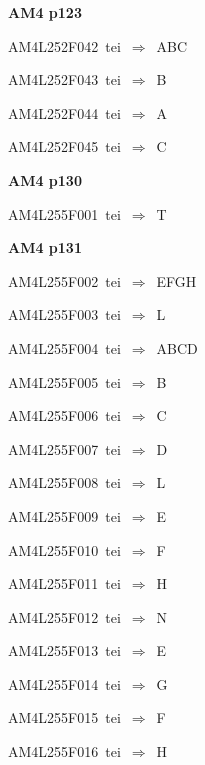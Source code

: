 \par\vfill\eject
{\bf\hfill AM4 p123\hfill\hbox{}}\par\bigskip
{\sixrm AM4L252F042\ {\sixit tei}\ }$\Rightarrow$\ ABC\par\smallskip
{\sixrm AM4L252F043\ {\sixit tei}\ }$\Rightarrow$\ B\par\smallskip
{\sixrm AM4L252F044\ {\sixit tei}\ }$\Rightarrow$\ A\par\smallskip
{\sixrm AM4L252F045\ {\sixit tei}\ }$\Rightarrow$\ C\par\smallskip

\par\vfill\eject
{\bf\hfill AM4 p130\hfill\hbox{}}\par\bigskip
{\sixrm AM4L255F001\ {\sixit tei}\ }$\Rightarrow$\ T\par\smallskip

\par\vfill\eject
{\bf\hfill AM4 p131\hfill\hbox{}}\par\bigskip
{\sixrm AM4L255F002\ {\sixit tei}\ }$\Rightarrow$\ EFGH\par\smallskip
{\sixrm AM4L255F003\ {\sixit tei}\ }$\Rightarrow$\ L\par\smallskip
{\sixrm AM4L255F004\ {\sixit tei}\ }$\Rightarrow$\ ABCD\par\smallskip
{\sixrm AM4L255F005\ {\sixit tei}\ }$\Rightarrow$\ B\par\smallskip
{\sixrm AM4L255F006\ {\sixit tei}\ }$\Rightarrow$\ C\par\smallskip
{\sixrm AM4L255F007\ {\sixit tei}\ }$\Rightarrow$\ D\par\smallskip
{\sixrm AM4L255F008\ {\sixit tei}\ }$\Rightarrow$\ L\par\smallskip
{\sixrm AM4L255F009\ {\sixit tei}\ }$\Rightarrow$\ E\par\smallskip
{\sixrm AM4L255F010\ {\sixit tei}\ }$\Rightarrow$\ F\par\smallskip
{\sixrm AM4L255F011\ {\sixit tei}\ }$\Rightarrow$\ H\par\smallskip
{\sixrm AM4L255F012\ {\sixit tei}\ }$\Rightarrow$\ N\par\smallskip
{\sixrm AM4L255F013\ {\sixit tei}\ }$\Rightarrow$\ E\par\smallskip
{\sixrm AM4L255F014\ {\sixit tei}\ }$\Rightarrow$\ G\par\smallskip
{\sixrm AM4L255F015\ {\sixit tei}\ }$\Rightarrow$\ F\par\smallskip
{\sixrm AM4L255F016\ {\sixit tei}\ }$\Rightarrow$\ H\par\smallskip

